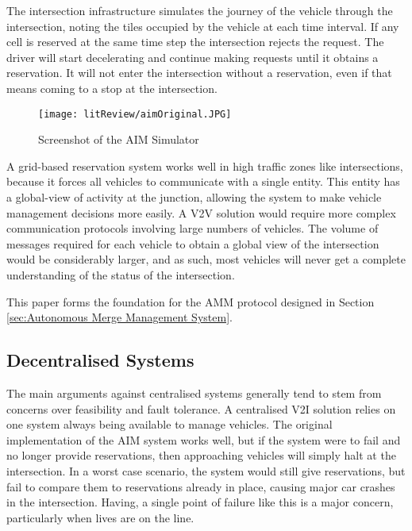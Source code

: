 The intersection infrastructure simulates the journey of the vehicle through the intersection, noting the tiles occupied by the vehicle at each time interval. If any cell is reserved at the same time step the intersection rejects the request. The driver will start decelerating and continue making requests until it obtains a reservation. It will not enter the intersection without a reservation, even if that means coming to a stop at the intersection.

\begin{figure}[htb]
\texttt{[image: litReview/aimOriginal.JPG]}
\caption{Screenshot of the AIM Simulator}
\label{fig:AIMOriginal}
\end{figure}

A grid-based reservation system works well in high traffic zones like intersections, because it forces all vehicles to communicate with a single entity. This entity has a global-view of activity at the junction, allowing the system to make vehicle management decisions more easily. A V2V solution would require more complex communication protocols involving large numbers of vehicles. The volume of messages required for each vehicle to obtain a global view of the intersection would be considerably larger, and as such, most vehicles will never get a complete understanding of the status of the intersection.

This paper forms the foundation for the AMM protocol designed in Section \ref{sec:Autonomous Merge Management System}.

\FloatBarrier
\subsection{Decentralised Systems}
\label{subsec:Decentralised Systems}
The main arguments against centralised systems generally tend to stem from concerns over feasibility and fault tolerance. A centralised V2I solution relies on one system always being available to manage vehicles. The original implementation of the AIM system works well, but if the system were to fail and no longer provide reservations, then approaching vehicles will simply halt at the intersection. In a worst case scenario, the system would still give reservations, but fail to compare them to reservations already in place, causing major car crashes in the intersection. Having, a single point of failure like this is a major concern, particularly when lives are on the line.

